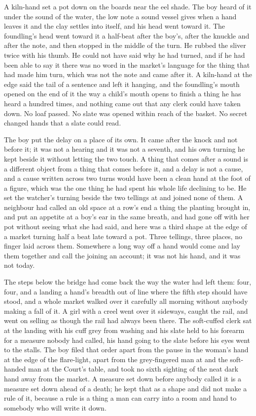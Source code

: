 A kiln-hand set a pot down on the boards near the eel shade. The boy heard  of it under the sound of the water, the low note a sound vessel gives when a hand leaves it and the clay settles into itself, and his head went toward it. The foundling's head went toward it a half-beat after the boy's, after the knuckle and after the note, and then stopped in the middle of the turn. He rubbed the sliver twice with his thumb. He could not have said why he had turned, and if he had been able to say it there was no word in the market's language for the thing that had made him turn, which was not the note and came after it. A kiln-hand at the edge said the tail of a sentence and left it hanging, and the foundling's mouth opened on the end of it the way a child's mouth opens to finish a thing he has heard a hundred times, and nothing came out that any clerk could have taken down. No loaf passed. No slate was opened within reach of the basket. No secret changed hands that a slate could read.

The boy put the delay on a place of its own. It came after the knock and not before it; it was not a hearing and it was not a seventh, and his own turning he kept beside it without letting the two touch. A thing that comes after a sound is a different object from a thing that comes before it, and a delay is not a cause, and a cause written across two turns would have been a clean hand at the foot of a figure, which was the one thing he had spent his whole life declining to be. He set the watcher's turning beside the two tellings at  and joined none of them. A neighbour had called an old space at a row's end a thing the planting brought in, and put an appetite at a boy's ear in the same breath, and had gone off with her pot without seeing what she had said, and here was a third shape at the edge of a market turning half a beat late toward a pot. Three tellings, three places, no finger laid across them. Somewhere a long way off a hand would come and lay them together and call the joining an account; it was not his hand, and it was not today.

The steps below the bridge had come back the way the water had left them: four, four, and a landing a hand's breadth out of line where the fifth step should have stood, and a whole market walked over it carefully all morning without anybody making a fall of it. A girl with a creel went over it sideways, caught the rail, and went on selling as though the rail had always been there. The soft-cuffed clerk sat at the landing with his cuff grey from washing and his slate held to his forearm for a measure nobody had called, his hand going to the slate before his eyes went to the stalls. The boy filed that order apart from the pause in the woman's hand at the edge of the flare-light, apart from the grey-fingered man at  and the soft-handed man at the Court's table, and took no sixth sighting of the neat dark hand away from the market. A measure set down before anybody called it is a measure set down ahead of a death; he kept that as a shape and did not make a rule of it, because a rule is a thing a man can carry into a room and hand to somebody who will write it down.

